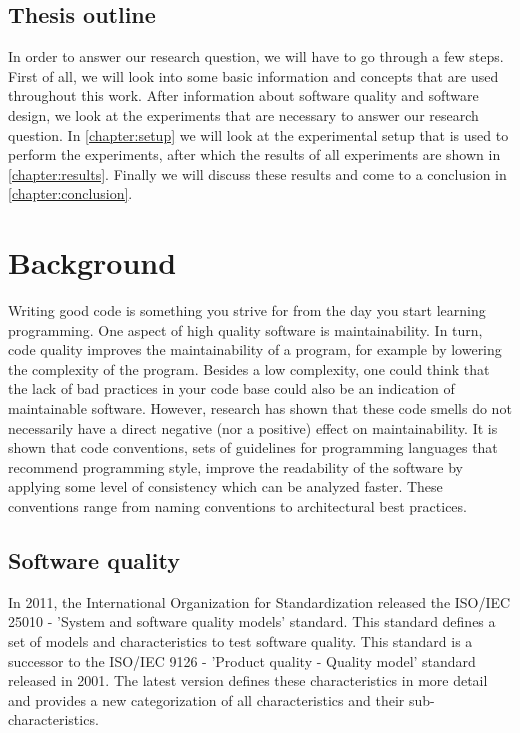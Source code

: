 \documentclass[twoside]{uva-inf-bachelor-thesis}
\begin{document}
\section{Thesis outline}
In order to answer our research question, we will have to go through a few steps. First of all, we will look into some basic information and concepts that are used throughout this work. After information about software quality and software design, we look at the experiments that are necessary to answer our research question. In \autoref{chapter:setup} we will look at the experimental setup that is used to perform the experiments, after which the results of all experiments are shown in \autoref{chapter:results}. Finally we will discuss these results and come to a conclusion in \autoref{chapter:conclusion}.

\chapter{Background}
\label{chapter:background}
Writing good code is something you strive for from the day you start learning programming. One aspect of high quality software is maintainability\cite{ISO9126,ISO25010}. In turn, code quality improves the maintainability of a program, for example by lowering the complexity of the program\cite{banker1993software}. Besides a low complexity, one could think that the lack of bad practices in your code base could also be an indication of maintainable software. However, research has shown that these code smells do not necessarily have a direct negative (nor a positive) effect on maintainability\cite{sjoberg2013quantifying}. It is shown that code conventions, sets of guidelines for programming languages that recommend programming style, improve the readability of the software by applying some level of consistency which can be analyzed faster\cite{javaconventions}. These conventions range from naming conventions to architectural best practices.

\section{Software quality}
In 2011, the International Organization for Standardization released the ISO/IEC 25010 - 'System and software quality models' standard\cite{ISO25010}. This standard defines a set of models and characteristics to test software quality. This standard is a successor to the ISO/IEC 9126 - 'Product quality - Quality model' standard\cite{ISO9126} released in 2001. The latest version defines these characteristics in more detail and provides a new categorization of all characteristics and their sub-characteristics.
\end{document}
